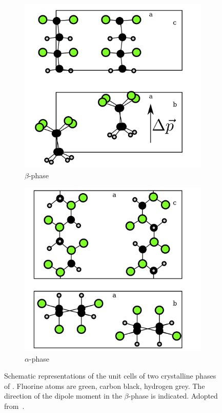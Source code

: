 \begin{figure}
\begin{subfigure}{0.5\textwidth}
\centering
	\includegraphics[width=0.8\linewidth]{./figs/chap1/betaunitcell}
	\caption{$\beta$-phase}
	\label{fig:betaunitcell}
\end{subfigure}
\begin{subfigure}{0.5\textwidth}
\centering
	\includegraphics[width=0.8\linewidth]{./figs/chap1/alphaunitcell}
	\caption{$\alpha$-phase}
	\label{fig:alphaunitcell}
\end{subfigure}
\caption[Schematic representations of the unit cells of two crystalline phases of \pvdf{}. Fluorine atoms are green, carbon black, hydrogen grey. The direction of the dipole moment in the $\beta$-phase is indicated.]{Schematic representations of the unit cells of two crystalline phases of \pvdf{}. Fluorine atoms are green, carbon black, hydrogen grey. The direction of the dipole moment in the $\beta$-phase is indicated. Adopted from~\cite[pp. 809 f.]{encyclopedia}.}
\label{fig:pvdfunit}
\end{figure}
